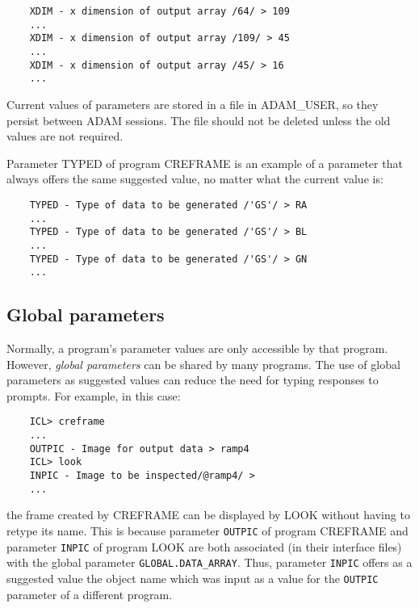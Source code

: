 \begin{small}
\begin{verbatim}
    XDIM - x dimension of output array /64/ > 109
    ...
    XDIM - x dimension of output array /109/ > 45
    ...
    XDIM - x dimension of output array /45/ > 16
    ...
\end{verbatim}
\end{small}

Current values of parameters are stored in a file in ADAM\_USER, so they
persist between ADAM sessions.
The file should not be deleted unless the old values are not required.

Parameter TYPED of program CREFRAME is an example of a parameter that always
offers the same suggested value, no matter what the current value is:

\begin{small}
\begin{verbatim}
    TYPED - Type of data to be generated /'GS'/ > RA
    ...
    TYPED - Type of data to be generated /'GS'/ > BL
    ...
    TYPED - Type of data to be generated /'GS'/ > GN
    ...
\end{verbatim}
\end{small}


\subsection{Global parameters}

Normally, a program's parameter values are only accessible by that program.
However, {\em global parameters} can be shared by many programs.
The use of global parameters as suggested values can reduce the need for typing
responses to prompts.
For example, in this case:

\begin{small}
\begin{verbatim}
    ICL> creframe
    ...
    OUTPIC - Image for output data > ramp4
    ICL> look
    INPIC - Image to be inspected/@ramp4/ >
    ...
\end{verbatim}
\end{small}

the frame created by CREFRAME can be displayed by LOOK without having to
retype its name.
This is because parameter {\small\tt OUTPIC} of program CREFRAME and parameter
{\small\tt INPIC} of program LOOK are both associated (in their interface files)
with the global parameter {\small\tt GLOBAL.DATA\_ARRAY}.
Thus, parameter {\small\tt INPIC} offers as a suggested value the object name
which was input as a value for the {\small\tt OUTPIC} parameter of a different
program.

